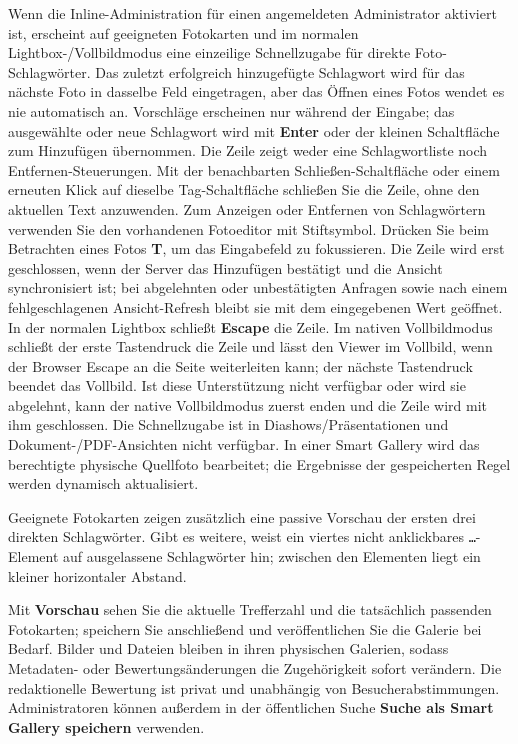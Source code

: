 \documentclass[11pt,a4paper]{article}
\newcommand{\ui}[1]{\textbf{#1}}
\begin{document}
Wenn die Inline-Administration für einen angemeldeten Administrator aktiviert
ist, erscheint auf geeigneten Fotokarten und im normalen Lightbox-/Vollbildmodus
eine einzeilige Schnellzugabe für direkte Foto-Schlagwörter. Das zuletzt
erfolgreich hinzugefügte Schlagwort wird für das nächste Foto in dasselbe Feld
eingetragen, aber das Öffnen eines Fotos wendet es nie automatisch an.
Vorschläge
erscheinen nur während der Eingabe; das ausgewählte oder neue Schlagwort wird
mit
\ui{Enter} oder der kleinen Schaltfläche zum Hinzufügen übernommen. Die Zeile
zeigt
weder eine Schlagwortliste noch Entfernen-Steuerungen. Mit der benachbarten
Schließen-Schaltfläche oder einem erneuten Klick auf dieselbe Tag-Schaltfläche
schließen Sie die Zeile, ohne den aktuellen Text anzuwenden. Zum Anzeigen oder
Entfernen
von Schlagwörtern verwenden Sie den vorhandenen Fotoeditor mit Stiftsymbol.
Drücken
Sie beim Betrachten eines Fotos \ui{T}, um das Eingabefeld zu fokussieren. Die
Zeile
wird erst geschlossen, wenn der Server das Hinzufügen bestätigt und die Ansicht
synchronisiert ist; bei abgelehnten oder unbestätigten Anfragen sowie nach einem
fehlgeschlagenen Ansicht-Refresh bleibt sie mit dem eingegebenen Wert geöffnet.
In der normalen Lightbox schließt \ui{Escape} die Zeile. Im nativen
Vollbildmodus
schließt der erste Tastendruck die Zeile und lässt den Viewer im Vollbild, wenn
der
Browser Escape an die Seite weiterleiten kann; der nächste Tastendruck beendet
das
Vollbild. Ist diese Unterstützung nicht verfügbar oder wird sie abgelehnt, kann
der
native Vollbildmodus zuerst enden und die Zeile wird mit ihm geschlossen. Die
Schnellzugabe ist in Diashows/Präsentationen und Dokument-/PDF-Ansichten nicht
verfügbar. In einer Smart Gallery wird das berechtigte physische Quellfoto
bearbeitet;
die Ergebnisse der gespeicherten Regel werden dynamisch aktualisiert.

Geeignete Fotokarten zeigen zusätzlich eine passive Vorschau der ersten drei
direkten Schlagwörter. Gibt es weitere, weist ein viertes nicht anklickbares
\texttt{…}-Element auf ausgelassene Schlagwörter hin; zwischen den Elementen
liegt ein kleiner horizontaler Abstand.

Mit \ui{Vorschau} sehen Sie die aktuelle Trefferzahl und die tatsächlich
passenden Fotokarten; speichern Sie anschließend und veröffentlichen Sie die
Galerie bei Bedarf. Bilder und Dateien bleiben in ihren physischen Galerien,
sodass Metadaten- oder Bewertungsänderungen die Zugehörigkeit sofort verändern.
Die redaktionelle Bewertung ist privat und unabhängig von Besucherabstimmungen.
Administratoren können außerdem in der öffentlichen Suche \ui{Suche als Smart
Gallery speichern} verwenden.
\end{document}
